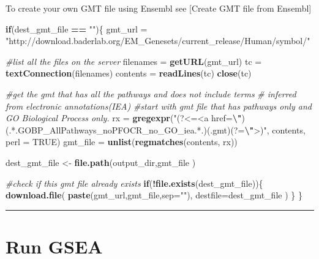 \documentclass[
]{book}
\newenvironment{Shaded}{\begin{snugshade}}{\end{snugshade}}
\newcommand{\AttributeTok}[1]{\textcolor[rgb]{0.13,0.29,0.53}{#1}}
\newcommand{\CommentTok}[1]{\textcolor[rgb]{0.56,0.35,0.01}{\textit{#1}}}
\newcommand{\ConstantTok}[1]{\textcolor[rgb]{0.56,0.35,0.01}{#1}}
\newcommand{\ControlFlowTok}[1]{\textcolor[rgb]{0.13,0.29,0.53}{\textbf{#1}}}
\newcommand{\FunctionTok}[1]{\textcolor[rgb]{0.13,0.29,0.53}{\textbf{#1}}}
\newcommand{\NormalTok}[1]{#1}
\newcommand{\OtherTok}[1]{\textcolor[rgb]{0.56,0.35,0.01}{#1}}
\newcommand{\SpecialCharTok}[1]{\textcolor[rgb]{0.81,0.36,0.00}{\textbf{#1}}}
\newcommand{\StringTok}[1]{\textcolor[rgb]{0.31,0.60,0.02}{#1}}
\begin{document}
To create your own GMT file using Ensembl see {[}Create GMT file from Ensembl{]}

\begin{Shaded}
\begin{Highlighting}[]
\ControlFlowTok{if}\NormalTok{(dest\_gmt\_file }\SpecialCharTok{==} \StringTok{""}\NormalTok{)\{}
\NormalTok{  gmt\_url }\OtherTok{=} \StringTok{"http://download.baderlab.org/EM\_Genesets/current\_release/Human/symbol/"}
  
  \CommentTok{\#list all the files on the server}
\NormalTok{  filenames }\OtherTok{=} \FunctionTok{getURL}\NormalTok{(gmt\_url)}
\NormalTok{  tc }\OtherTok{=} \FunctionTok{textConnection}\NormalTok{(filenames)}
\NormalTok{  contents }\OtherTok{=} \FunctionTok{readLines}\NormalTok{(tc)}
  \FunctionTok{close}\NormalTok{(tc)}
  
  \CommentTok{\#get the gmt that has all the pathways and does not include terms }
  \CommentTok{\# inferred from electronic annotations(IEA)}
  \CommentTok{\#start with gmt file that has pathways only and GO Biological Process only.}
\NormalTok{  rx }\OtherTok{=} \FunctionTok{gregexpr}\NormalTok{(}\StringTok{"(?\textless{}=\textless{}a href=}\SpecialCharTok{\textbackslash{}"}\StringTok{)(.*.GOBP\_AllPathways\_noPFOCR\_no\_GO\_iea.*.)(.gmt)(?=}\SpecialCharTok{\textbackslash{}"}\StringTok{\textgreater{})"}\NormalTok{,}
\NormalTok{    contents, }\AttributeTok{perl =} \ConstantTok{TRUE}\NormalTok{)}
\NormalTok{  gmt\_file }\OtherTok{=} \FunctionTok{unlist}\NormalTok{(}\FunctionTok{regmatches}\NormalTok{(contents, rx))}
  
\NormalTok{  dest\_gmt\_file }\OtherTok{\textless{}{-}} \FunctionTok{file.path}\NormalTok{(output\_dir,gmt\_file )}
  
  \CommentTok{\#check if this gmt file already exists}
  \ControlFlowTok{if}\NormalTok{(}\SpecialCharTok{!}\FunctionTok{file.exists}\NormalTok{(dest\_gmt\_file))\{}
    \FunctionTok{download.file}\NormalTok{(}
      \FunctionTok{paste}\NormalTok{(gmt\_url,gmt\_file,}\AttributeTok{sep=}\StringTok{""}\NormalTok{),}
      \AttributeTok{destfile=}\NormalTok{dest\_gmt\_file}
\NormalTok{    )}
\NormalTok{  \}}
\NormalTok{\}}
\end{Highlighting}
\end{Shaded}

\begin{center}\rule{0.5\linewidth}{0.5pt}\end{center}

\section{Run GSEA}\label{run-gsea}
\end{document}
